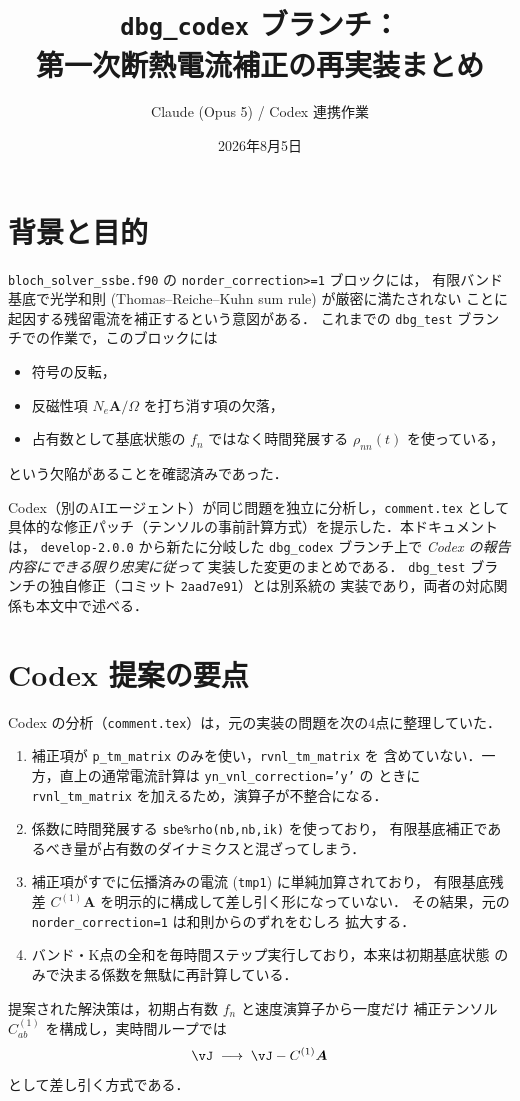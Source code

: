 \documentclass[dvipdfmx,a4paper,11pt]{jsarticle}
\title{\texttt{dbg\_codex} ブランチ：\\
  第一次断熱電流補正の再実装まとめ}
\author{Claude (Opus 5) / Codex 連携作業}
\date{2026年8月5日}
\newcommand{\file}[1]{\texttt{#1}}
\newcommand{\vA}{\bm{A}}
\begin{document}
\maketitle

\section{背景と目的}
\file{bloch\_solver\_ssbe.f90} の \texttt{norder\_correction>=1} ブロックには，
有限バンド基底で光学和則 (Thomas--Reiche--Kuhn sum rule) が厳密に満たされない
ことに起因する残留電流を補正するという意図がある．
これまでの \texttt{dbg\_test} ブランチでの作業で，このブロックには
\begin{itemize}[nosep]
  \item 符号の反転，
  \item 反磁性項 $N_e\vA/\Omega$ を打ち消す項の欠落，
  \item 占有数として基底状態の $f_n$ ではなく時間発展する $\rho_{nn}(t)$ を使っている，
\end{itemize}
という欠陥があることを確認済みであった．

Codex（別のAIエージェント）が同じ問題を独立に分析し，\file{comment.tex} として
具体的な修正パッチ（テンソルの事前計算方式）を提示した．本ドキュメントは，
\texttt{develop-2.0.0} から新たに分岐した \texttt{dbg\_codex} ブランチ上で
\emph{Codex の報告内容にできる限り忠実に従って} 実装した変更のまとめである．
\texttt{dbg\_test} ブランチの独自修正（コミット \texttt{2aad7e91}）とは別系統の
実装であり，両者の対応関係も本文中で述べる．

\section{Codex 提案の要点}
Codex の分析（\file{comment.tex}）は，元の実装の問題を次の4点に整理していた．
\begin{enumerate}[nosep]
  \item 補正項が \texttt{p\_tm\_matrix} のみを使い，\texttt{rvnl\_tm\_matrix} を
    含めていない．一方，直上の通常電流計算は \texttt{yn\_vnl\_correction='y'} の
    ときに \texttt{rvnl\_tm\_matrix} を加えるため，演算子が不整合になる．
  \item 係数に時間発展する \texttt{sbe\%rho(nb,nb,ik)} を使っており，
    有限基底補正であるべき量が占有数のダイナミクスと混ざってしまう．
  \item 補正項がすでに伝播済みの電流 (\texttt{tmp1}) に単純加算されており，
    有限基底残差 $C^{(1)}\vA$ を明示的に構成して差し引く形になっていない．
    その結果，元の \texttt{norder\_correction=1} は和則からのずれをむしろ
    拡大する．
  \item バンド・K点の全和を毎時間ステップ実行しており，本来は初期基底状態
    のみで決まる係数を無駄に再計算している．
\end{enumerate}
提案された解決策は，初期占有数 $f_n$ と速度演算子から一度だけ
補正テンソル $C^{(1)}_{ab}$ を構成し，実時間ループでは
\[
  \vJ \;\longrightarrow\; \vJ - C^{(1)}\vA
\]
として差し引く方式である．
\end{document}
